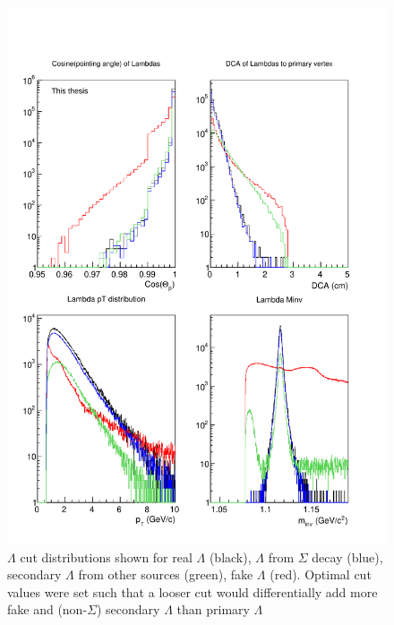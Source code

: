 \begin{figure}
\includegraphics[width=36pc]{Figures/2014-03-31-Distribution-Lambda-4Types-CosP-DCA-pT-Minv.pdf}
\caption[$\Lambda$ cut distributions]{$\Lambda$ cut distributions shown for real $\Lambda$ (black), $\Lambda$ from $\Sigma$ decay (blue), secondary $\Lambda$ from other sources (green), fake $\Lambda$ (red). 
Optimal cut values were set such that a looser cut would differentially add more fake and (non-$\Sigma$) secondary $\Lambda$ than primary $\Lambda$}
\label{fig:LambdaCutDists1}
\end{figure}

